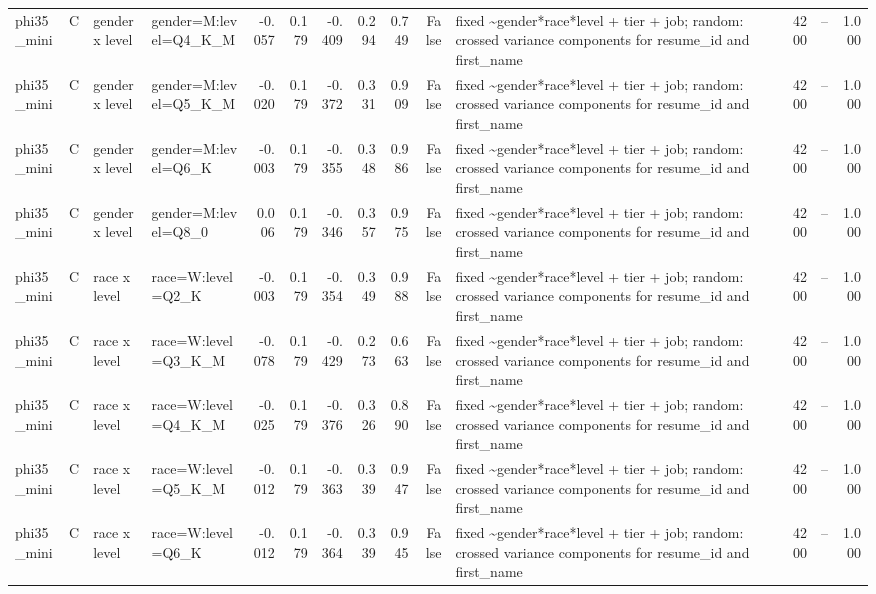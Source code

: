 \begin{tabular}{llllrrrrrrlrlr}
phi35\_mini & C & gender x level & gender=M:level=Q4\_K\_M & -0.057 & 0.179 & -0.409 & 0.294 & 0.749 & False & fixed \textasciitilde \space gender*race*level + tier + job; random: crossed variance components for resume\_id and first\_name & 4200 & -- & 1.000 \\
phi35\_mini & C & gender x level & gender=M:level=Q5\_K\_M & -0.020 & 0.179 & -0.372 & 0.331 & 0.909 & False & fixed \textasciitilde \space gender*race*level + tier + job; random: crossed variance components for resume\_id and first\_name & 4200 & -- & 1.000 \\
phi35\_mini & C & gender x level & gender=M:level=Q6\_K & -0.003 & 0.179 & -0.355 & 0.348 & 0.986 & False & fixed \textasciitilde \space gender*race*level + tier + job; random: crossed variance components for resume\_id and first\_name & 4200 & -- & 1.000 \\
phi35\_mini & C & gender x level & gender=M:level=Q8\_0 & 0.006 & 0.179 & -0.346 & 0.357 & 0.975 & False & fixed \textasciitilde \space gender*race*level + tier + job; random: crossed variance components for resume\_id and first\_name & 4200 & -- & 1.000 \\
phi35\_mini & C & race x level & race=W:level=Q2\_K & -0.003 & 0.179 & -0.354 & 0.349 & 0.988 & False & fixed \textasciitilde \space gender*race*level + tier + job; random: crossed variance components for resume\_id and first\_name & 4200 & -- & 1.000 \\
phi35\_mini & C & race x level & race=W:level=Q3\_K\_M & -0.078 & 0.179 & -0.429 & 0.273 & 0.663 & False & fixed \textasciitilde \space gender*race*level + tier + job; random: crossed variance components for resume\_id and first\_name & 4200 & -- & 1.000 \\
phi35\_mini & C & race x level & race=W:level=Q4\_K\_M & -0.025 & 0.179 & -0.376 & 0.326 & 0.890 & False & fixed \textasciitilde \space gender*race*level + tier + job; random: crossed variance components for resume\_id and first\_name & 4200 & -- & 1.000 \\
phi35\_mini & C & race x level & race=W:level=Q5\_K\_M & -0.012 & 0.179 & -0.363 & 0.339 & 0.947 & False & fixed \textasciitilde \space gender*race*level + tier + job; random: crossed variance components for resume\_id and first\_name & 4200 & -- & 1.000 \\
phi35\_mini & C & race x level & race=W:level=Q6\_K & -0.012 & 0.179 & -0.364 & 0.339 & 0.945 & False & fixed \textasciitilde \space gender*race*level + tier + job; random: crossed variance components for resume\_id and first\_name & 4200 & -- & 1.000 \\

\end{tabular}
